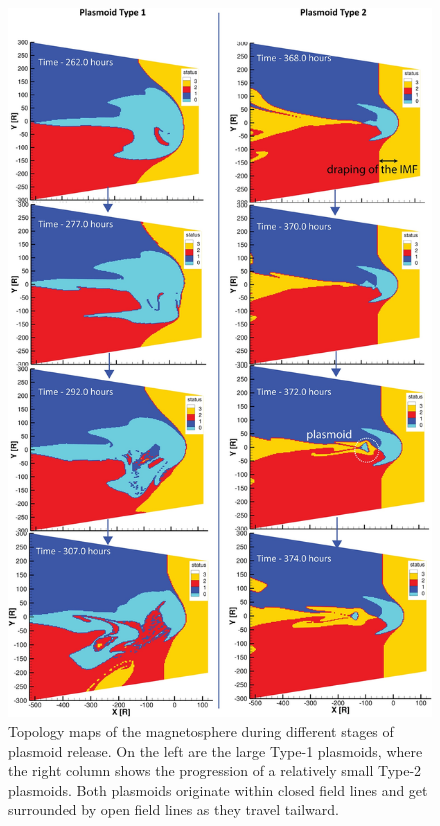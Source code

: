 \begin{figure}
    \centering
    \includegraphics[height=0.8\textheight]{images4/status-fieldlines-magnetosphere.jpg}
    \caption{Topology maps of the magnetosphere during different stages of plasmoid release. On the left are the large Type-1 plasmoids, where the right column shows the progression of a relatively small Type-2 plasmoids. Both plasmoids originate within closed field lines and get surrounded by open field lines as they travel tailward.}
    \label{fig:status-magnetosphere}
\end{figure}

